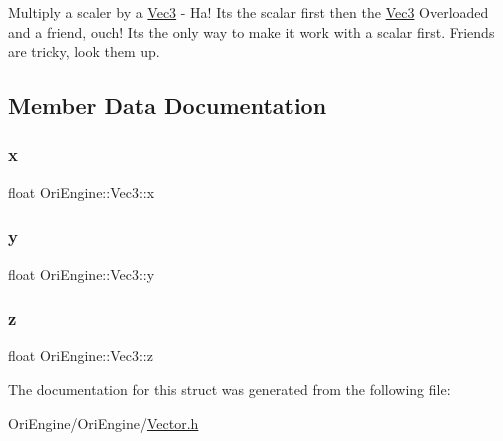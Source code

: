 Multiply a scaler by a \hyperlink{struct_ori_engine_1_1_vec3}{Vec3} -\/ Ha! It\textquotesingle{}s the scalar first then the \hyperlink{struct_ori_engine_1_1_vec3}{Vec3} Overloaded and a friend, ouch! It\textquotesingle{}s the only way to make it work with a scalar first. Friends are tricky, look them up. 

\subsection{Member Data Documentation}
\hypertarget{struct_ori_engine_1_1_vec3_a2682de13a3ac0391777172f7f0af4027}{}\label{struct_ori_engine_1_1_vec3_a2682de13a3ac0391777172f7f0af4027} 
\subsubsection{\texorpdfstring{x}{x}}
{\footnotesize\ttfamily float Ori\+Engine\+::\+Vec3\+::x}

\hypertarget{struct_ori_engine_1_1_vec3_af7815329fe7e5d909afea88c87ac9ff6}{}\label{struct_ori_engine_1_1_vec3_af7815329fe7e5d909afea88c87ac9ff6} 
\subsubsection{\texorpdfstring{y}{y}}
{\footnotesize\ttfamily float Ori\+Engine\+::\+Vec3\+::y}

\hypertarget{struct_ori_engine_1_1_vec3_a9d4a41bdb6ce600fa8a23d27752ba2d1}{}\label{struct_ori_engine_1_1_vec3_a9d4a41bdb6ce600fa8a23d27752ba2d1} 
\subsubsection{\texorpdfstring{z}{z}}
{\footnotesize\ttfamily float Ori\+Engine\+::\+Vec3\+::z}



The documentation for this struct was generated from the following file\+:\begin{DoxyCompactItemize}
\item 
Ori\+Engine/\+Ori\+Engine/\hyperlink{_vector_8h}{Vector.\+h}\end{DoxyCompactItemize}
